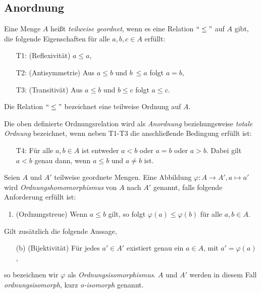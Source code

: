 \subsection{Anordnung}
\begin{defn}\label{defgs} 
Eine Menge $A$ heißt \textit{teilweise geordnet}, wenn es eine Relation $``\leq " $ auf $A$ gibt, die folgende Eigenschaften für alle $ a,b,c \in A$  erfüllt:
%
\begin{enumerate}
\item[T1:] (Reflexivität)  $a \leq  a$,
\item[T2:] (Antisymmetrie)  Aus $a \leq  b$ und $b~ \leq a$ folgt $a = b$,
\item[T3:] (Transitivät) Aus $a \leq b$ und $b \leq c$ folgt $a \leq c$.
\end{enumerate}
%
Die Relation $``\leq "$ bezeichnet eine teilweise Ordnung auf $A$.
\end{defn}
Die oben definierte Ordnungsrelation wird als \textit{Anordnung} beziehungsweise \textit{totale Ordnung} bezeichnet, wenn neben T1-T3 die anschließende Bedingung erfüllt ist:
%
\begin{enumerate}
\item[T4:] Für alle $a, b \in A$ ist entweder $a < b$ oder $a = b$ oder $a > b$. Dabei gilt $a < b$ genau dann, wenn $a \leq b$ und $a\neq b$ ist. 
\end{enumerate}
%
%
%
%
%
%
%
\begin{defn}\label{ordnungsisomorph}
Seien $A$ und $A'$ teilweise geordnete Mengen. Eine Abbildung $\varphi \colon A \rightarrow A', a \mapsto a'$ wird \textit{Ordnungshomomorphismus} von $A$ nach $A'$ genannt, falls folgende Anforderung erfüllt ist:
\begin{enumerate}
\item (Ordnungstreue) Wenn $a \leq b$ gilt, so folgt $\varphi(a) \leq \varphi(b)$ für alle $a, b  \in A$.
\end{enumerate}
Gilt zusätzlich die folgende Aussage, 
\begin{enumerate}
\item[(b)] (Bijektivität) Für jedes $a' \in A'$ existiert genau ein $a \in A$, mit $a' = \varphi(a)$,
\end{enumerate}
so bezeichnen wir $\varphi$ als \textit{Ordnungsisomorphismus}.
$A$ und $A'$ werden in diesem Fall \textit{ordnungsisomorph}, kurz \textit{o-isomorph} genannt.
\end{defn}
